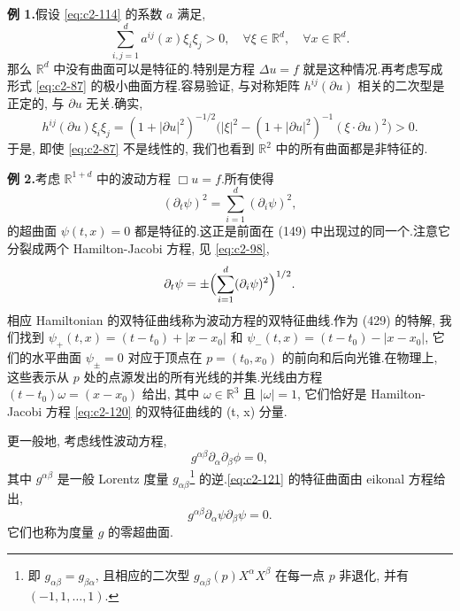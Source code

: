 \noindent\textbf{例 1.}\quad 假设 \eqref{eq:c2-114} 的系数 $a$ 满足,
\begin{equation}
\sum_{i, j = 1}^{d} a^{ij}(x) \xi_{i} \xi_{j} > 0, \quad \forall \xi \in \mathbb{R}^{d}, \quad \forall x \in \mathbb{R}^{d}. \label{eq:c2-118}
\end{equation}
那么 $\mathbb{R}^{d}$ 中没有曲面可以是特征的.特别是方程 $\Delta u = f$ 就是这种情况.再考虑写成形式 \eqref{eq:c2-87} 的极小曲面方程.容易验证, 与对称矩阵 $h^{ij}(\partial u)$ 相关的二次型是正定的, 与 $\partial u$ 无关.确实,
\[
h^{ij}(\partial u) \xi_{i} \xi_{j} = (1 + |\partial u|^{2})^{-1/2} \bigl(|\xi|^{2} - (1 + |\partial u|^{2})^{-1} (\xi \cdot \partial u)^{2}\bigr) > 0.
\]
于是, 即使 \eqref{eq:c2-87} 不是线性的, 我们也看到 $\mathbb{R}^{2}$ 中的所有曲面都是非特征的.

\noindent\textbf{例 2.}\quad 考虑 $\mathbb{R}^{1+d}$ 中的波动方程 $\Box u = f$.所有使得
\begin{equation}
(\partial_{t} \psi)^{2} = \sum_{i = 1}^{d} (\partial_{i} \psi)^{2}, \label{eq:c2-119}
\end{equation}
的超曲面 $\psi(t, x) = 0$ 都是特征的.这正是前面在 (149) 中出现过的同一个.注意它分裂成两个 Hamilton-Jacobi 方程, 见 \eqref{eq:c2-98},
\begin{equation}
\partial_{t} \psi = \pm \Bigl(\sum_{i = 1}^{d} (\partial_{i} \psi)^{2}\Bigr)^{1/2}. \label{eq:c2-120}
\end{equation}
相应 Hamiltonian 的双特征曲线称为波动方程的双特征曲线.作为 (429) 的特解, 我们找到 $\psi_{+}(t, x) = (t - t_{0}) + |x - x_{0}|$ 和 $\psi_{-}(t, x) = (t - t_{0}) - |x - x_{0}|$, 它们的水平曲面 $\psi_{\pm} = 0$ 对应于顶点在 $p = (t_{0}, x_{0})$ 的前向和后向光锥.在物理上, 这些表示从 $p$ 处的点源发出的所有光线的并集.光线由方程 $(t - t_{0}) \omega = (x - x_{0})$ 给出, 其中 $\omega \in \mathbb{R}^{3}$ 且 $|\omega| = 1$, 它们恰好是 Hamilton-Jacobi 方程 \eqref{eq:c2-120} 的双特征曲线的 (t, x) 分量.

更一般地, 考虑线性波动方程,
\begin{equation}
g^{\alpha \beta} \partial_{\alpha} \partial_{\beta} \phi = 0, \label{eq:c2-121}
\end{equation}
其中 $g^{\alpha \beta}$ 是一般 Lorentz 度量 $g_{\alpha \beta}$\footnote{即 $g_{\alpha \beta} = g_{\beta \alpha}$, 且相应的二次型 $g_{\alpha \beta}(p) X^{\alpha} X^{\beta}$ 在每一点 $p$ 非退化, 并有 $(-1, 1, \ldots, 1)$.} 的逆.\eqref{eq:c2-121} 的特征曲面由 eikonal 方程给出,
\begin{equation}
g^{\alpha \beta} \partial_{\alpha} \psi \partial_{\beta} \psi = 0. \label{eq:c2-122}
\end{equation}
它们也称为度量 $g$ 的零超曲面.

